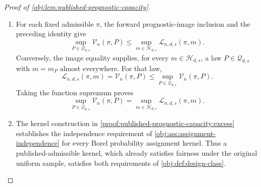\documentclass[11pt]{article}
\begin{document}
\begin{proof}[Proof of \cref{obj:lem:published-prognostic-capacity}]
\begin{enumerate}
For any single-unit law \(P\) with bounded strictly positive covariate density and finite outcome second moments, the independent covariate sample law satisfies
\[
\operatorname{Law}_{P}\bigl((U_i)_{i=1}^n\bigr)
\ll \operatorname{Unif}([0,1]^d)^{\otimes n}.
\]
Hence the replacement preserves the entire experiment law:
\[
\operatorname{Law}_{P,\pi}\!\left(
(U_i,O_i(0),O_i(1))_{i=1}^n,Z\right)
=
\operatorname{Law}_{P,\pi^{\mathrm{fair}}}\!\left(
(U_i,O_i(0),O_i(1))_{i=1}^n,Z\right).
\]
Apply the published excess-variance identity
\citep[Proposition 2.3, equation (2.4), with Assumption 2.1 and Definition 2.2]{Cytrynbaum2026Limits}
to the pointwise fair replacement and transfer it through this equality. It gives
\[
\mathcal V_n(\pi,P)
=
\frac4n\,
\mathbb E_{P,\pi}
\left(\sum_{i=1}^n Z_i m_P(U_i)\right)^2
\geq0.
\]

Now take \(P\in\mathcal Q_{d,s}\), and choose \(m\in\mathcal H_{d,s}\) with \(m_P=m\) almost everywhere. Independence and uniformity of the unit covariates give
\[
\operatorname{Law}_{P,\pi}\bigl((U_i)_{i=1}^n,Z\bigr)
=
\operatorname{Unif}([0,1]^d)^{\otimes n}(dX)\,\pi(X,dZ).
\]
Moreover, the finite sample avoids the exceptional null set simultaneously:
\[
\Pr_{P,\pi}\!\left(
m_P(U_i)=m(U_i)\text{ for every }i
\right)=1.
\]
Square integrability of \(m\) makes the finite signed sum square integrable. Substituting the preceding two identities yields
\[
0\leq\mathcal V_n(\pi,P)
=\mathcal L_{n,d,s}(\pi,m_P)
=\mathcal L_{n,d,s}(\pi,m).
\]
This also proves invariance of the signing loss under the null representatives used here.

\item For each fixed admissible \(\pi\), the forward prognostic-image inclusion and the preceding identity give
\[
\sup_{P\in\mathcal Q_{d,s}}\mathcal V_n(\pi,P)
\leq
\sup_{m\in\mathcal H_{d,s}}\mathcal L_{n,d,s}(\pi,m).
\]
Conversely, the image equality supplies, for every \(m\in\mathcal H_{d,s}\), a law \(P\in\mathcal Q_{d,s}\) with \(m=m_P\) almost everywhere. For that law,
\[
\mathcal L_{n,d,s}(\pi,m)
=\mathcal V_n(\pi,P)
\leq
\sup_{P\in\mathcal Q_{d,s}}\mathcal V_n(\pi,P).
\]
Taking the function supremum proves
\[
\sup_{P\in\mathcal Q_{d,s}}\mathcal V_n(\pi,P)
=
\sup_{m\in\mathcal H_{d,s}}\mathcal L_{n,d,s}(\pi,m).
\]

\item The kernel construction in \cref{proof:published-prognostic-capacity:excess} establishes the independence requirement of \cref{obj:ass:assignment-independence} for every Borel probability assignment kernel. Thus a published-admissible kernel, which already satisfies fairness under the original uniform sample, satisfies both requirements of \cref{obj:def:design-class}.


\end{enumerate}
\end{proof}
\end{document}

